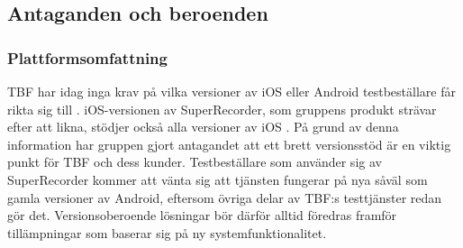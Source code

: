 \subsection{Antaganden och beroenden}
\subsubsection{Plattformsomfattning}
TBF har idag inga krav på vilka versioner av iOS eller Android testbeställare får rikta sig till \parencite{betafaq}. iOS-versionen av SuperRecorder, som gruppens produkt strävar efter att likna, stödjer också alla versioner av iOS \parencite{superrec}. På grund av denna information har gruppen gjort antagandet att ett brett versionsstöd är en viktig punkt för TBF och dess kunder. Testbeställare som använder sig av SuperRecorder kommer att vänta sig att tjänsten fungerar på nya såväl som gamla versioner av Android, eftersom övriga delar av TBF:s testtjänster redan gör det. Versionsoberoende lösningar bör därför alltid föredras framför tillämpningar som baserar sig på ny systemfunktionalitet.

